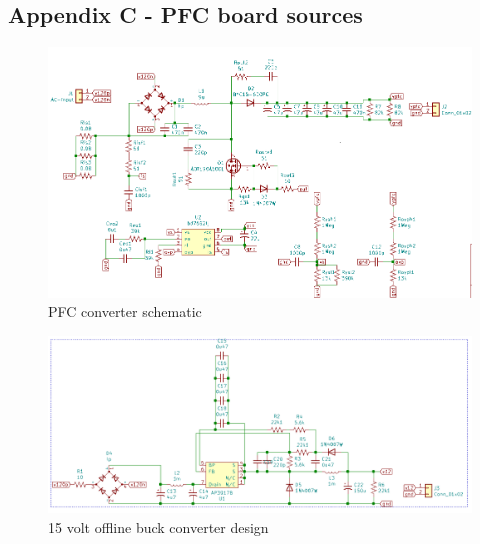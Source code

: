 \documentclass[15pt]{article}
\begin{document}
\subsection{Appendix C - PFC board sources}

\begin{figure}[H]
    \includegraphics[width=\textwidth]{pfcschema}
    \caption{PFC converter schematic}
    \label{fig:PFC}
\end{figure}

\begin{figure}[H]
    \includegraphics[width=\textwidth]{pfcbuck}
    \caption{15 volt offline buck converter design}
    \label{fig:buck}
\end{figure}
\end{document}
